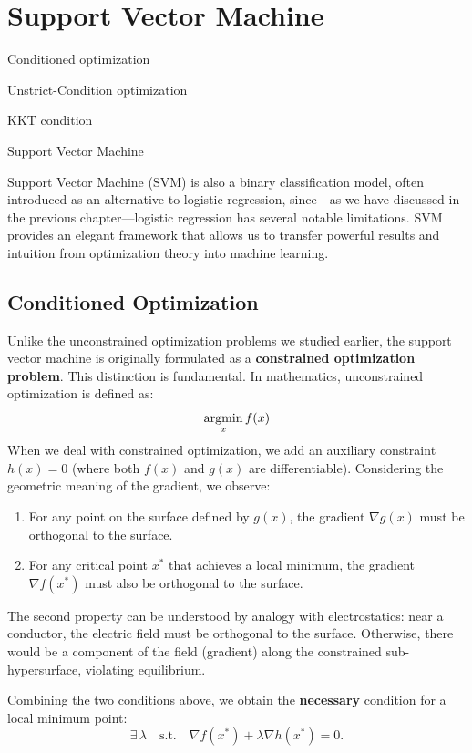 \documentclass[../main]{subfiles}
\begin{document}
\chapter{Support Vector Machine}
\begin{introduction}
\item Conditioned optimization
\item Unstrict-Condition optimization
\item KKT condition
\item Support Vector Machine
\end{introduction}
Support Vector Machine (SVM) is also a binary classification model, often introduced as an alternative to logistic regression, since—as we have discussed in the previous chapter—logistic regression has several notable limitations. SVM provides an elegant framework that allows us to transfer powerful results and intuition from optimization theory into machine learning.
\section{Conditioned Optimization}
Unlike the unconstrained optimization problems we studied earlier, the support vector machine is originally formulated as a \textbf{constrained optimization problem}. This distinction is fundamental. In mathematics, unconstrained optimization is defined as:
\begin{equation}
    \mathop{\mathrm{argmin}}_x f(x)
\end{equation}
When we deal with constrained optimization, we add an auxiliary constraint $h(x)=0$ (where both $f(x)$ and $g(x)$ are differentiable). Considering the geometric meaning of the gradient, we observe:

\begin{enumerate}
    \item For any point on the surface defined by $g(x)$, the gradient $\nabla g(x)$ must be orthogonal to the surface.
    \item For any critical point $x^*$ that achieves a local minimum, the gradient $\nabla f(x^*)$ must also be orthogonal to the surface.
\end{enumerate}

\begin{note}
    The second property can be understood by analogy with electrostatics: near a conductor, the electric field must be orthogonal to the surface. Otherwise, there would be a component of the field (gradient) along the constrained sub-hypersurface, violating equilibrium.
\end{note}
Combining the two conditions above, we obtain the \textbf{necessary} condition for a local minimum point:
\begin{equation}
    \exists \,\lambda \quad \text{s.t.} \quad \nabla f(x^*) + \lambda \nabla h(x^*) = 0 .
\end{equation}
\end{document}
